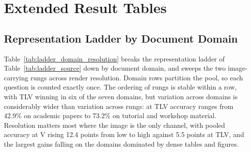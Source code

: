 
\section{Extended Result Tables}
\label{app:extended_findings}

\subsection{Representation Ladder by Document Domain}
\label{app:ladder_domain}
Table~\ref{tab:ladder_domain_resolution} breaks the representation ladder of Table~\ref{tab:ladder_source} down by document domain, and sweeps the two image-carrying rungs across render resolution. Domain rows partition the pool, so each question is counted exactly once. The ordering of rungs is stable within a row, with TLV winning in six of the seven domains, but variation across domains is considerably wider than variation across rungs: at TLV accuracy ranges from 42.9\% on academic papers to 73.2\% on tutorial and workshop material. Resolution matters most where the image is the only channel, with pooled accuracy at V rising 12.4 points from low to high against 5.5 points at TLV, and the largest gains falling on the domains dominated by dense tables and figures.


